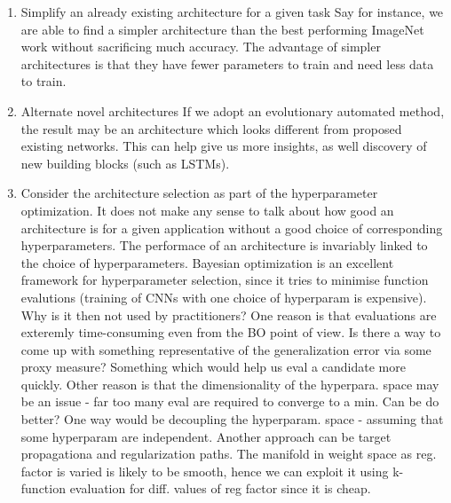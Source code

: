 \documentclass{article}
\begin{document}
\begin{enumerate}
\item Simplify an already existing architecture for a given task \newline
	Say for instance, we are able to find a simpler architecture than the best performing ImageNet work without sacrificing much accuracy. The advantage of simpler architectures is that they have fewer parameters to train and need less data to train.
\item Alternate novel architectures \newline
	If we adopt an evolutionary automated method, the result may be an architecture which looks different from proposed existing networks. This can help give us more insights, as well discovery of new building blocks (such as LSTMs). 
\item Consider the architecture selection as part of the hyperparameter optimization. \newline
	It does not make any sense to talk about how good an architecture is for a given application without a good choice of corresponding hyperparameters. The performace of an architecture is invariably linked to the choice of hyperparameters. 
	Bayesian optimization is an excellent framework for hyperparameter selection, since it tries to minimise function evalutions (training of CNNs with one choice of hyperparam is expensive). Why is it then not used by practitioners?
	One reason is that evaluations are exteremly time-consuming even from the BO point of view. Is there a way to come up with something representative of the generalization error via some proxy measure? Something which would help us eval a candidate more quickly.
	Other reason is that the dimensionality of the hyperpara. space may be an issue - far too many eval are required to converge to a min. Can be do better? One way would be decoupling the hyperparam. space - assuming that some hyperparam are independent. Another approach can be target propagationa and regularization paths. The manifold in weight space as reg. factor is varied is likely to be smooth, hence we can exploit it using k-function evaluation for diff. values of reg factor since it is cheap.
\end{enumerate}

\newpage


\end{document}
